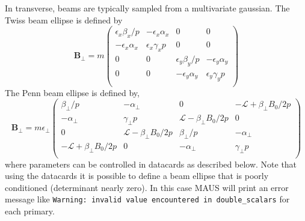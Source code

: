 In transverse, beams are typically sampled from a multivariate gaussian. The Twiss beam ellipse is defined by
\begin{equation}
\mathbf{B_\perp} = m \left(\begin{array}{cccc}
\epsilon_x \beta_x/p   & -\epsilon_x\alpha_x & 0 & 0 \\
-\epsilon_x\alpha_x & \epsilon_x\gamma_x p  & 0 & 0 \\
0 & 0  & \epsilon_y\beta_y/p  & -\epsilon_y\alpha_y \\
0 & 0 & -\epsilon_y\alpha_y & \epsilon_y\gamma_y p \\
\end{array}\right)
\end{equation}
The Penn beam ellipse is defined by,
\begin{equation}
\mathbf{B_\perp} = m\epsilon_\perp \left(\begin{array}{cccc}
\beta_\perp/p   & -\alpha_\perp & 0 & -\mathcal{L}+\beta_\perp B_0/2p \\
-\alpha_\perp & \gamma_\perp p  & \mathcal{L}-\beta_\perp B_0/2p & 0 \\
0 & \mathcal{L}-\beta_\perp B_0/2p  & \beta_\perp/p  & -\alpha_\perp \\
-\mathcal{L}+\beta_\perp B_0/2p & 0 & -\alpha_\perp & \gamma_\perp p \\
\end{array}\right)
\end{equation}
where parameters can be controlled in datacards as described below. Note that using the datacards it is possible to define a beam ellipse that is poorly conditioned (determinant nearly zero). In this case MAUS will print an error message like \verb|Warning: invalid value encountered in double_scalars| for each primary.


